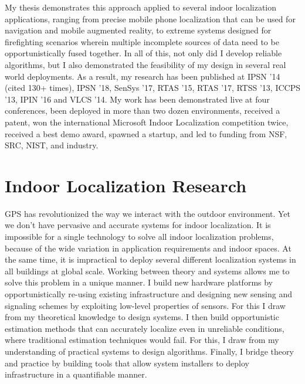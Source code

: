 \documentclass[10pt]{article}
\begin{document}
My thesis demonstrates this approach applied to several indoor localization applications, ranging from precise mobile phone localization that can be used for navigation and mobile augmented reality, to extreme systems designed for firefighting scenarios wherein multiple incomplete sources of data need to be opportunistically fused together. 
In all of this, not only did I develop reliable algorithms, but I also demonstrated the feasibility of my design in several real world deployments.
As a result, my research has been published at IPSN '14 (cited 130+ times), IPSN '18, SenSys '17, RTAS '15, RTAS '17, RTSS '13, ICCPS '13, IPIN '16 and VLCS '14. My work has been demonstrated live at four conferences, been deployed in more than two dozen environments, received a patent, won the international Microsoft Indoor Localization competition twice, received a best demo award, spawned a startup, and led to funding from NSF, SRC, NIST, and industry.



\section{Indoor Localization Research}

GPS has revolutionized the way we interact with the outdoor environment.  %
Yet we don't have pervasive and accurate systems for indoor localization.  
It is impossible for a single technology to solve all indoor localization problems, because of the wide variation in application requirements and indoor spaces.  At the same time, it is impractical to deploy several different localization systems in all buildings at global scale. %
Working between theory and systems allows me to solve this problem in a unique manner. I build new hardware platforms by opportunistically re-using existing infrastructure and designing new sensing and signaling schemes by exploiting low-level properties of sensors. For this I draw from my theoretical knowledge to design systems. 
I then build opportunistic estimation methods that can accurately localize even in unreliable conditions, where traditional estimation techniques would fail. For this, I draw from my understanding of practical systems to design algorithms. Finally, I bridge theory and practice by building tools that  allow system installers to deploy infrastructure in a quantifiable manner. 
\end{document}
